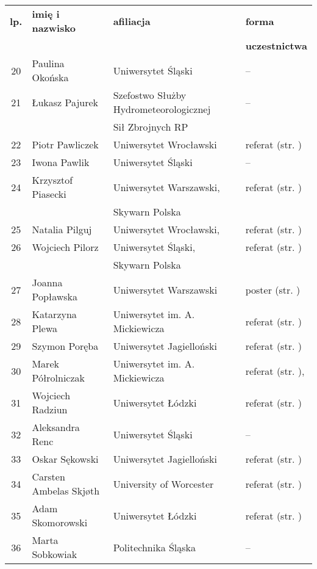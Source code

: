 \documentclass[12pt,oneside]{book}
\begin{document}
\normalsize
\begin{tabular}{||c|l|l|l||}
\hline
\hline
\textbf{lp.} & \textbf{imię i nazwisko} & \textbf{afiliacja} & \textbf{forma}\\
 &  &  & \textbf{uczestnictwa}\\
\hline
\hline
\hline
20	 & Paulina Okońska & Uniwersytet Śląski & -- \\\hline
21 	 & Łukasz Pajurek & Szefostwo Służby Hydrometeorologicznej & -- \\
	 &  & Sił Zbrojnych RP &  \\\hline
22 	 & Piotr Pawliczek & Uniwersytet Wrocławski & referat (str. \pageref{pawliczek})\\\hline
23 	 & Iwona Pawlik & Uniwersytet Śląski & -- \\\hline
24 	 & Krzysztof Piasecki & Uniwersytet Warszawski, & referat (str. \pageref{piasecki})\\
		 &  & Skywarn Polska &  \\\hline
25     & Natalia Pilguj & Uniwersytet Wrocławski, & referat (str. \pageref{pilguj})\\\hline
26	 & Wojciech Pilorz & Uniwersytet Śląski, & referat (str. \pageref{piasecki})\\
	 &  & Skywarn Polska &  \\\hline
27 	 & Joanna Popławska & Uniwersytet Warszawski & poster (str. \pageref{solecki}) \\\hline	
28  	 & Katarzyna Plewa & Uniwersytet im. A. Mickiewicza & referat  (str. \pageref{plewa})\\\hline
29	 & Szymon Poręba & Uniwersytet Jagielloński & referat (str. \pageref{poreba}) \\\hline
30	 & Marek Półrolniczak & Uniwersytet im. A. Mickiewicza & referat (str. \pageref{kendzierski}), \pageref{kolendowicz} \\\hline
31   & Wojciech Radziun & Uniwersytet Łódzki & referat (str. \pageref{radziun}) \\\hline
32 	 & Aleksandra Renc & Uniwersytet Śląski & -- \\\hline
33	 & Oskar Sękowski & Uniwersytet Jagielloński & referat (str. \pageref{sekowski}) \\\hline
34	 & Carsten Ambelas Skjøth & University of Worcester & referat (str. \pageref{bilinska}) \\\hline
35	 & Adam Skomorowski & Uniwersytet Łódzki & referat (str. \pageref{skomorowski}) \\\hline	
36	 & Marta Sobkowiak & Politechnika Śląska & -- \\\hline

\end{tabular}
\end{document}
